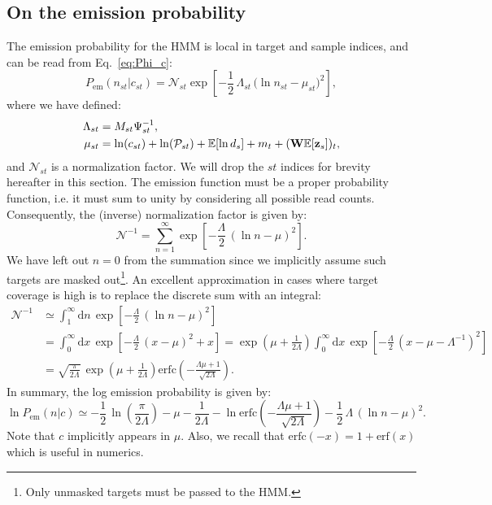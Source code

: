\documentclass[nofootinbib,amssymb,amsmath]{revtex4}
\newcommand{\vz}{{\bf z}}
\newcommand{\vW}{{\bf W}}
\newcommand{\PP}{\mathcal{P}}
\newcommand{\EE}{\mathbb{E}}
\begin{document}
\subsection{On the emission probability}
The emission probability for the HMM is local in target and sample indices, and can be read from Eq.~\eqref{eq:Phi_c}:
\begin{equation}
P_\mathrm{em}(n_{st}|c_{st}) = \mathcal{N}_{st} \exp\left[- \frac{1}{2} \, \Lambda_{st} \, \big(\ln n_{st} - \mu_{st}\big)^2\right],
\end{equation}
where we have defined:
\begin{align}
\Lambda_{st} &= M_{st}\Psi_{st}^{-1},\nonumber\\
\mu_{st} &= \ln(c_{st}) + \ln(\PP_{st}) + \EE[\ln d_s] + m_t + (\vW \EE[\vz_s])_t,
\end{align}
and $\mathcal{N}_{st}$ is a normalization factor. We will drop the $st$ indices for brevity hereafter in this section. The emission function must be a proper probability function, i.e. it must sum to unity by considering all possible read counts. Consequently, the (inverse) normalization factor is given by:
\begin{equation}
\mathcal{N}^{-1} = \sum_{n=1}^\infty \exp\left[-\frac{\Lambda}{2}\,(\ln n - \mu)^2\right].
\end{equation}
We have left out $n=0$ from the summation since we implicitly assume such targets are masked out\footnote{Only unmasked targets must be passed to the HMM.}. An excellent approximation in cases where target coverage is high is to replace the discrete sum with an integral:
\begin{align}
\mathcal{N}^{-1} &\simeq \int_{1}^\infty \mathrm{d}n\,\exp\left[-\frac{\Lambda}{2}\,(\ln n - \mu)^2\right]\nonumber\\
&= \int_{0}^\infty \mathrm{d}x \, \exp\left[-\frac{\Lambda}{2}\,(x - \mu)^2 + x\right] = \exp\left(\mu + \frac{1}{2\Lambda}\right)\int_{0}^\infty \mathrm{d}x \, \exp\left[-\frac{\Lambda}{2}\,(x - \mu - \Lambda^{-1})^2\right]\nonumber\\
&= \sqrt{\frac{\pi}{2\Lambda}}\,\exp\left(\mu + \frac{1}{2\Lambda}\right) \mathrm{erfc}\left(-\frac{\Lambda \mu + 1}{\sqrt{2\Lambda}}\right).
\end{align}
In summary, the log emission probability is given by:
\begin{equation}
\ln P_{\mathrm{em}}(n|c) \simeq -\frac{1}{2}\,\ln\left(\frac{\pi}{2\Lambda}\right) - \mu - \frac{1}{2\Lambda} - \ln \mathrm{erfc}\left(-\frac{\Lambda \mu + 1}{\sqrt{2\Lambda}}\right) - \frac{1}{2}\,\Lambda\,(\ln n - \mu)^2.
\end{equation}
Note that $c$ implicitly appears in $\mu$. Also, we recall that $\mathrm{erfc}(-x) = 1 + \mathrm{erf}(x)$ which is useful in numerics.
\end{document}
